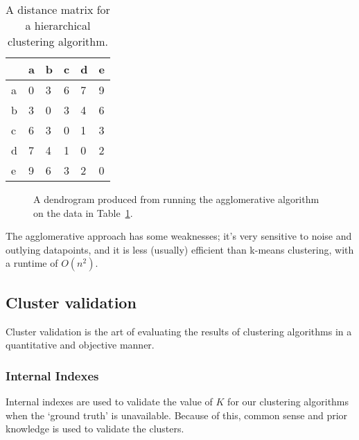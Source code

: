 
\begin{table}[h]
  \centering
  \begin{tabular}{llllll}
      & a  & b & c & d & e\\ \hline
    a & 0  & 3 & 6 & 7 & 9\\
    b & 3  & 0 & 3 & 4 & 6\\
    c & 6  & 3 & 0 & 1 & 3\\
    d & 7  & 4 & 1 & 0 & 2\\
    e & 9  & 6 & 3 & 2 & 0
  \end{tabular}
  \caption{A distance matrix for a hierarchical clustering algorithm.}
  \label{data1}
\end{table}

\begin{figure}[h]
  
  \caption{A dendrogram produced from running the agglomerative algorithm on the
  data in Table~\ref{data1}.}
  \label{fig:dendrogram}
\end{figure}

The agglomerative approach has some weaknesses; it's very sensitive to noise and
outlying datapoints, and it is less (usually) efficient than k-means clustering,
with a runtime of $O(n^2)$.

\subsection{Cluster validation}

Cluster validation is the art of evaluating the results of clustering algorithms
in a quantitative and objective manner.

\subsubsection{Internal Indexes}

Internal indexes are used to validate the value of $K$ for our clustering
algorithms when the `ground truth' is unavailable.  Because of this, common sense and prior knowledge is used to validate
the clusters.


